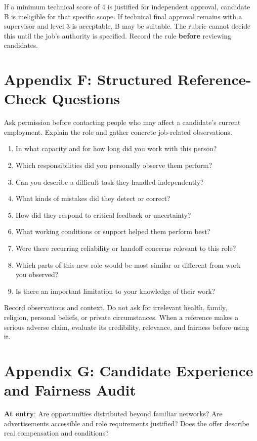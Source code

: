 If a minimum technical score of 4 is justified for independent approval, candidate B is ineligible for that specific scope. If technical final approval remains with a supervisor and level 3 is acceptable, B may be suitable. The rubric cannot decide this until the job's authority is specified. Record the rule \textbf{before} reviewing candidates.

\section*{Appendix F: Structured Reference-Check Questions}

Ask permission before contacting people who may affect a candidate's current employment. Explain the role and gather concrete job-related observations.
\begin{enumerate}[leftmargin=*]
\item In what capacity and for how long did you work with this person?
\item Which responsibilities did you personally observe them perform?
\item Can you describe a difficult task they handled independently?
\item What kinds of mistakes did they detect or correct?
\item How did they respond to critical feedback or uncertainty?
\item What working conditions or support helped them perform best?
\item Were there recurring reliability or handoff concerns relevant to this role?
\item Which parts of this new role would be most similar or different from work you observed?
\item Is there an important limitation to your knowledge of their work?
\end{enumerate}

Record observations and context. Do not ask for irrelevant health, family, religion, personal beliefs, or private circumstances. When a reference makes a serious adverse claim, evaluate its credibility, relevance, and fairness before using it.

\section*{Appendix G: Candidate Experience and Fairness Audit}

\textbf{At entry}: Are opportunities distributed beyond familiar networks? Are advertisements accessible and role requirements justified? Does the offer describe real compensation and conditions?

